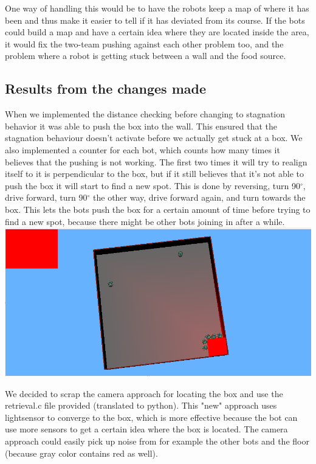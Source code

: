 \documentclass[12pt, a4paper]{article}
\begin{document}
One way of handling this would be to have the robots keep a map of where it has been and thus make it easier to tell if it has deviated from its course. If the bots could build a map and have a certain idea where they are located inside the area, it would fix the two-team pushing against each other problem too, and the problem where a robot is getting stuck between a wall and the food source.



\subsection{Results from the changes made}
When we implemented the distance checking before changing to stagnation behavior it was able to push the box into the wall. This ensured that the stagnation behaviour doesn't activate before we actually get stuck at a box. We also implemented a counter for each bot, which counts how many times it believes that the pushing is not working. The first two times it will try to realign itself to it is perpendicular to the box, but if it still believes that it's not able to push the box it will start to find a new spot. This is done by reversing, turn 90$^{\circ}$, drive forward, turn 90$^{\circ}$ the other way, drive forward again, and turn towards the box. This lets the bots push the box for a certain amount of time before trying to find a new spot, because there might be other bots joining in after a while.\\
\includegraphics[width=\linewidth]{1.finalState}

We decided to scrap the camera approach for locating the box and use the retrieval.c file provided (translated to python). This "new" approach uses lightsensor to converge to the box, which is more effective because the bot can use more sensors to get a certain idea where the box is located. The camera approach could easily pick up noise from for example the other bots and the floor (because gray color contains red as well).
\end{document}
